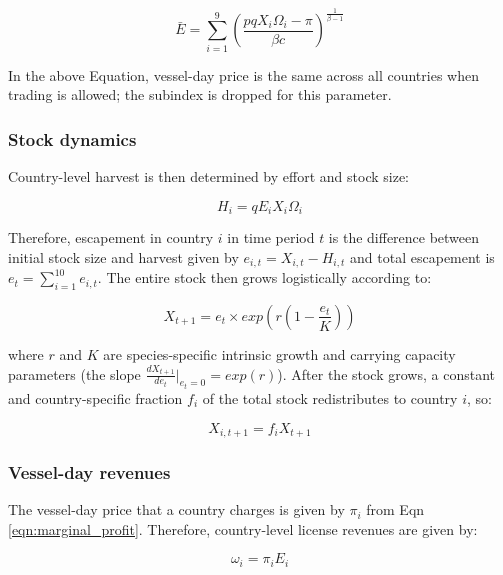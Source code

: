 \documentclass[12pt]{article}
\begin{document}
\begin{equation}
\bar{E} = \sum_{i = 1}^9\left(\frac{pqX_i\Omega_i - \pi}{\beta c }\right) ^ {\frac{1}{\beta - 1}}
\label{eqn:Ebar}
\end{equation}

\noindent In the above Equation, vessel-day price is the same across all countries when trading is allowed; the subindex is dropped for this parameter.

\subsubsection{Stock dynamics}

Country-level harvest is then determined by effort and stock size:

\begin{equation}
H_i = qE_iX_i\Omega_i
\label{eqn:harvest}
\end{equation}


\noindent Therefore, escapement in country $i$ in time period $t$ is the difference between initial stock size and harvest given by $e_{i,t} = X_{i,t} - H_{i,t}$ and total escapement is $e_t=\sum_{i=1}^{10}e_{i,t}$. The entire stock then grows logistically according to:

\begin{equation}
X_{t+1} = e_t \times  exp\left(r \left(1 - \frac{e_t}{K} \right)\right)
\label{eqn:grow}
\end{equation}

\noindent where $r$ and $K$ are species-specific intrinsic growth and carrying capacity parameters (the slope $\frac{dX_{t+1}}{de_t}|_{e_t=0}=exp(r)$). After the stock grows, a constant and country-specific fraction $f_i$ of the total stock redistributes to country $i$, so:

\begin{equation}
X_{i,t+1} = f_iX_{t+1}
\label{eqn:disperse}
\end{equation}

\subsubsection{Vessel-day revenues}

The vessel-day price that a country charges is given by $\pi_i$ from Eqn \ref{eqn:marginal_profit}. Therefore, country-level license revenues are given by:

\begin{equation}
\omega_i = \pi_iE_i
\label{eqn:license_revenue}
\end{equation}
\end{document}
